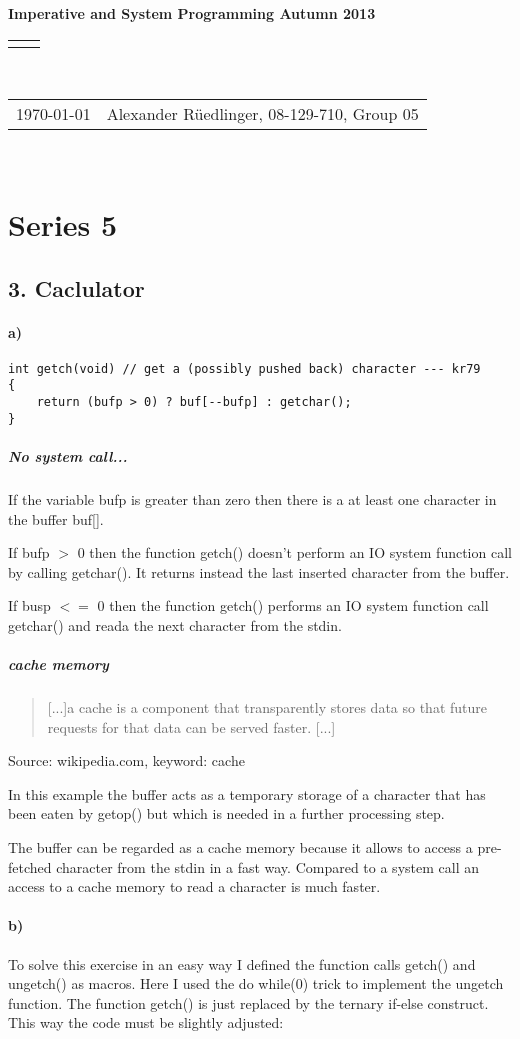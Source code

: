 \documentclass[12pt]{article}
\renewcommand{\title}[1]{\textbf{#1}\\}
\renewcommand{\line}{\begin{tabularx}{\textwidth}{X>{\raggedleft}X}\hline\\\end{tabularx}\\[-0.5cm]}
\newcommand{\leftright}[2]{\begin{tabularx}{\textwidth}{X>{\raggedleft}X}#1%
& #2\\\end{tabularx}\\[-0.5cm]}
\begin{document}
\title{Imperative and System Programming Autumn 2013}
\line
\leftright{\today}{Alexander Rüedlinger, 08-129-710, Group 05} %
\section*{Series 5}
\subsection*{3. Caclulator}
\paragraph{a)} 

\begin{lstlisting}
int getch(void)	// get a (possibly pushed back) character --- kr79
{
    return (bufp > 0) ? buf[--bufp] : getchar();
}
\end{lstlisting}

\subparagraph{No system call...} If the variable bufp is greater than zero then there is a at least one character in the buffer buf[].

If bufp $>$ 0 then the function getch() doesn't perform an IO system function call by calling getchar(). It returns instead the last inserted character from the buffer.

If busp $<=$ 0 then the function getch() performs an IO system function call getchar() and reada the next character from the stdin.

\subparagraph{cache memory}
\begin{quote}
[...]a cache is a component that transparently stores data so that future requests for that data can be served faster. [...]
\end{quote}
Source: wikipedia.com, keyword: cache

In this example the buffer acts as a temporary storage of a character that has been eaten by getop() but which is needed in a further processing step.

The buffer can be regarded as a cache memory because it allows to access a pre-fetched character from the stdin in a fast way. Compared to a system call an access to a cache memory to read a character is much faster.

\paragraph{b)}
To solve this exercise in an easy way I defined the function calls getch() and ungetch() as macros. Here I used the do {}while(0) trick to implement the ungetch function. The function getch() is just replaced by the ternary if-else construct. This way the code must be slightly adjusted:
\end{document}
